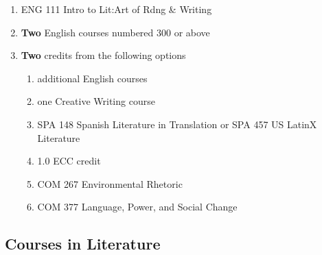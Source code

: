 \documentclass[
  letterpaper,
]{scrbook}
\providecommand{\tightlist}{%
  \setlength{\itemsep}{0pt}\setlength{\parskip}{0pt}}
\begin{document}
\begin{enumerate}
\def\labelenumi{\arabic{enumi}.}
\tightlist
\item
  ENG 111 Intro to Lit:Art of Rdng \& Writing\\
\item
  \textbf{Two} English courses numbered 300 or above\\
\item
  \textbf{Two} credits from the following options

  \begin{enumerate}
  \def\labelenumii{\alph{enumii}.}
  \tightlist
  \item
    additional English courses\\
  \item
    one Creative Writing course\\
  \item
    SPA 148 Spanish Literature in Translation or SPA 457 US LatinX
    Literature\\
  \item
    1.0 ECC credit\\
  \item
    COM 267 Environmental Rhetoric\\
  \item
    COM 377 Language, Power, and Social Change
  \end{enumerate}
\end{enumerate}

\subsection{Courses in Literature}\label{courses-in-literature}
\end{document}
